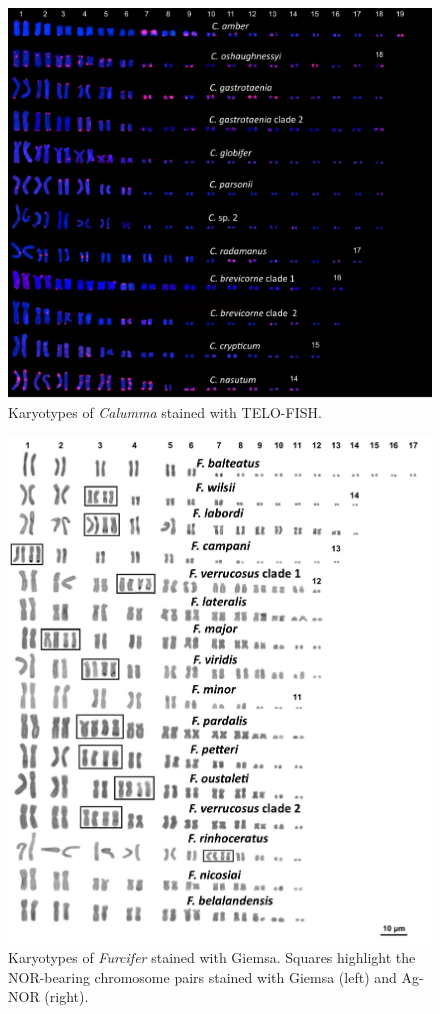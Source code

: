 \documentclass[a4paper, 12pt]{article}
\begin{document}
\newpage
\begin{figure}[H]
 \centering
  \includegraphics[width = \linewidth]{figures/marcello-s4.jpg}
  \caption{Karyotypes of \textit{Calumma} stained with TELO-FISH.
}
  \label{fig-s4}
\end{figure}

\newpage
\begin{figure}[H]
 \centering
  \includegraphics[width = \linewidth]{figures/marcello-s5.jpg}
  \caption{Karyotypes of \textit{Furcifer} stained with Giemsa. Squares highlight the NOR-bearing chromosome pairs stained with Giemsa (left) and Ag-NOR (right).
}
  \label{fig-s5}
\end{figure}
\end{document}
